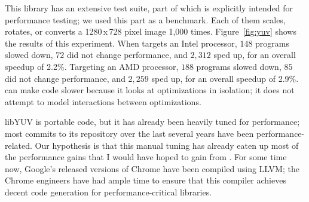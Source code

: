 This library has an extensive test suite, part of which is explicitly
intended for performance testing; we used this part as a benchmark.
%
Each of them scales, rotates, or converts a 1280\,x\,728 pixel
image 1,000 times.
%
Figure~\ref{fig:yuv} shows the results of this experiment.
%
When \minotaur{} targets an Intel processor, $148$ programs slowed down, $72$
did not change performance, and $2,312$ sped up, for an overall speedup of
2.2\%.
%
Targeting an AMD processor, $188$ programs slowed down, $85$ did not
change performance, and $2,259$ sped up, for an overall speedup of 2.9\%.
%
\minotaur{} can make code slower because it looks at optimizations in
isolation; it does not attempt to model interactions between
optimizations.


libYUV is portable code, but it has already been heavily tuned for
performance; most commits to its repository over the last several
years have been performance-related.
%
Our hypothesis is that this manual tuning has already eaten up most of
the performance gains that I would have hoped to gain from \minotaur{}.
%
For some time now, Google's released versions of Chrome have been
compiled using LLVM; the Chrome engineers have had ample time to
ensure that this compiler achieves decent code generation for
performance-critical libraries.



